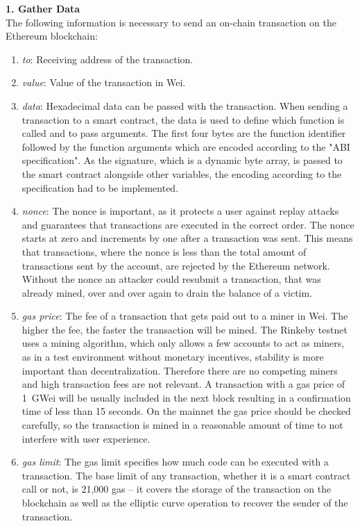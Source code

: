 \textbf{1. Gather Data}\\
The following information is necessary to send an on-chain transaction on the Ethereum blockchain:
\begin{enumerate}
  \item \textit{to}: Receiving address of the transaction.
  \item \textit{value}: Value of the transaction in Wei.
  \item \textit{data}: Hexadecimal data can be passed with the transaction.
  When sending a transaction to a smart contract, the data is used to define which function is called and to pass arguments.
  The first four bytes are the function identifier followed by the function arguments which are encoded according to the "ABI specification"\cite{abi-encoding}.
  As the signature, which is a dynamic byte array, is passed to the smart contract alongside other variables, the encoding according to the specification had to be implemented.
  \item \textit{nonce}: The nonce is important, as it protects a user against replay attacks and guarantees that transactions are executed in the correct order.
  The nonce starts at zero and increments by one after a transaction was sent.
  This means that transactions, where the nonce is less than the total amount of transactions sent by the account, are rejected by the Ethereum network.
  Without the nonce an attacker could resubmit a transaction, that was already mined, over and over again to drain the balance of a victim.
  \item \textit{gas price}: The fee of a transaction that gets paid out to a miner in Wei.
  The higher the fee, the faster the transaction will be mined.
  The Rinkeby testnet uses a  mining algorithm, which only allows a few accounts to act as miners, as in a test environment without monetary incentives, stability is more important than decentralization.
  Therefore there are no competing miners and high transaction fees are not relevant.
  A transaction with a gas price of 1~GWei will be usually included in the next block resulting in a confirmation time of less than 15 seconds.
  On the mainnet the gas price should be checked carefully, so the transaction is mined in a reasonable amount of time to not interfere with user experience.
  \item \textit{gas limit}: The gas limit specifies how much code can be executed with a transaction.
  The base limit of any transaction, whether it is a smart contract call or not, is 21,000 gas – it covers the storage of the transaction on the blockchain as well as the elliptic curve operation to recover the sender of the transaction\cite{design-rationale}.

\end{enumerate}
